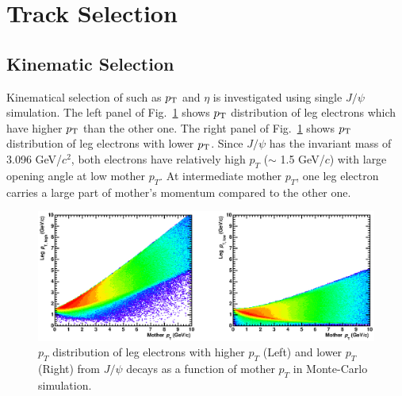 
\section{Track Selection}
\label{sec_4_trackrec}
\subsection{Kinematic Selection}
Kinematical selection of such as $p_{\rm{T}}$ and $\eta$ is investigated using single $J/\psi$ simulation. 
The left panel of Fig.~\ref{fig_4_legptkin} shows $p_{\rm{T}}$ distribution of leg electrons which have higher $p_{\rm{T}}$ than the other one. 
The right panel of Fig.~\ref{fig_4_legptkin} shows $p_{\rm{T}}$ distribution of leg electrons with lower $p_{\rm{T}}$. 
Since $J/\psi$ has the invariant mass of 3.096 GeV/$c^{2}$, both electrons have relatively high $p_{T}$ ($\sim$ 1.5 GeV/$c$) with large opening angle at low mother $p_{T}$.  
At intermediate mother $p_{T}$, one leg electron carries a large part of mother's momentum compared to the other one. 
\begin{figure}[!h]
  \centering
  \includegraphics[width=16cm]{chap4/figure/Kinematics/Jpsi_mompt_legpt.eps}
  \caption{ $p_{T}$ distribution of leg electrons with higher $p_{T}$ (Left) and lower $p_{T}$ (Right) from $J/\psi$ decays as a function of mother $p_{T}$ in Monte-Carlo simulation. }
  \label{fig_4_legptkin}
\end{figure}

